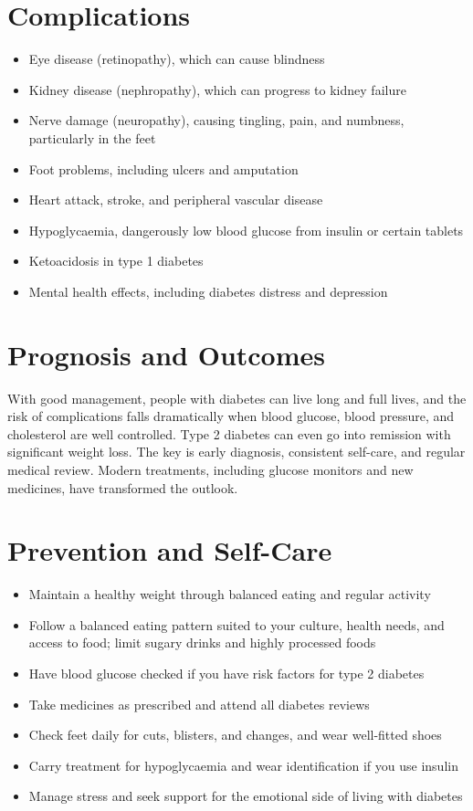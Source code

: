\section*{Complications}
\begin{itemize}
    \item Eye disease (retinopathy), which can cause blindness
    \item Kidney disease (nephropathy), which can progress to kidney failure
    \item Nerve damage (neuropathy), causing tingling, pain, and numbness, particularly in the feet
    \item Foot problems, including ulcers and amputation
    \item Heart attack, stroke, and peripheral vascular disease
    \item Hypoglycaemia, dangerously low blood glucose from insulin or certain tablets
    \item Ketoacidosis in type 1 diabetes
    \item Mental health effects, including diabetes distress and depression
\end{itemize}

\section*{Prognosis and Outcomes}
With good management, people with diabetes can live long and full lives, and the risk of complications falls dramatically when blood glucose, blood pressure, and cholesterol are well controlled. Type 2 diabetes can even go into remission with significant weight loss. The key is early diagnosis, consistent self-care, and regular medical review. Modern treatments, including glucose monitors and new medicines, have transformed the outlook.

\section*{Prevention and Self-Care}
\begin{itemize}
    \item Maintain a healthy weight through balanced eating and regular activity
    \item Follow a balanced eating pattern suited to your culture, health needs, and access to food; limit sugary drinks and highly processed foods
    \item Have blood glucose checked if you have risk factors for type 2 diabetes
    \item Take medicines as prescribed and attend all diabetes reviews
    \item Check feet daily for cuts, blisters, and changes, and wear well-fitted shoes
    \item Carry treatment for hypoglycaemia and wear identification if you use insulin
    \item Manage stress and seek support for the emotional side of living with diabetes
\end{itemize}


